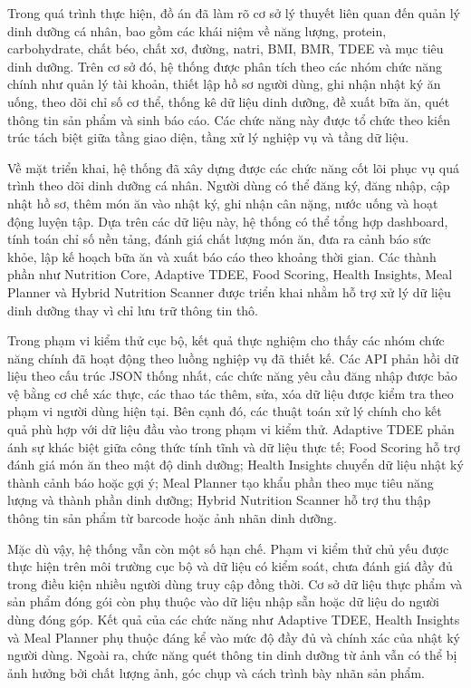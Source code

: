 Trong quá trình thực hiện, đồ án đã làm rõ cơ sở lý thuyết liên quan đến quản lý dinh dưỡng cá nhân, bao gồm các khái niệm về năng lượng, protein, carbohydrate, chất béo, chất xơ, đường, natri, BMI, BMR, TDEE và mục tiêu dinh dưỡng. Trên cơ sở đó, hệ thống được phân tích theo các nhóm chức năng chính như quản lý tài khoản, thiết lập hồ sơ người dùng, ghi nhận nhật ký ăn uống, theo dõi chỉ số cơ thể, thống kê dữ liệu dinh dưỡng, đề xuất bữa ăn, quét thông tin sản phẩm và sinh báo cáo. Các chức năng này được tổ chức theo kiến trúc tách biệt giữa tầng giao diện, tầng xử lý nghiệp vụ và tầng dữ liệu.

Về mặt triển khai, hệ thống đã xây dựng được các chức năng cốt lõi phục vụ quá trình theo dõi dinh dưỡng cá nhân. Người dùng có thể đăng ký, đăng nhập, cập nhật hồ sơ, thêm món ăn vào nhật ký, ghi nhận cân nặng, nước uống và hoạt động luyện tập. Dựa trên các dữ liệu này, hệ thống có thể tổng hợp dashboard, tính toán chỉ số nền tảng, đánh giá chất lượng món ăn, đưa ra cảnh báo sức khỏe, lập kế hoạch bữa ăn và xuất báo cáo theo khoảng thời gian. Các thành phần như Nutrition Core, Adaptive TDEE, Food Scoring, Health Insights, Meal Planner và Hybrid Nutrition Scanner được triển khai nhằm hỗ trợ xử lý dữ liệu dinh dưỡng thay vì chỉ lưu trữ thông tin thô.

Trong phạm vi kiểm thử cục bộ, kết quả thực nghiệm cho thấy các nhóm chức năng chính đã hoạt động theo luồng nghiệp vụ đã thiết kế. Các API phản hồi dữ liệu theo cấu trúc JSON thống nhất, các chức năng yêu cầu đăng nhập được bảo vệ bằng cơ chế xác thực, các thao tác thêm, sửa, xóa dữ liệu được kiểm tra theo phạm vi người dùng hiện tại. Bên cạnh đó, các thuật toán xử lý chính cho kết quả phù hợp với dữ liệu đầu vào trong phạm vi kiểm thử. Adaptive TDEE phản ánh sự khác biệt giữa công thức tính tĩnh và dữ liệu thực tế; Food Scoring hỗ trợ đánh giá món ăn theo mật độ dinh dưỡng; Health Insights chuyển dữ liệu nhật ký thành cảnh báo hoặc gợi ý; Meal Planner tạo khẩu phần theo mục tiêu năng lượng và thành phần dinh dưỡng; Hybrid Nutrition Scanner hỗ trợ thu thập thông tin sản phẩm từ barcode hoặc ảnh nhãn dinh dưỡng.

Mặc dù vậy, hệ thống vẫn còn một số hạn chế. Phạm vi kiểm thử chủ yếu được thực hiện trên môi trường cục bộ và dữ liệu có kiểm soát, chưa đánh giá đầy đủ trong điều kiện nhiều người dùng truy cập đồng thời. Cơ sở dữ liệu thực phẩm và sản phẩm đóng gói còn phụ thuộc vào dữ liệu nhập sẵn hoặc dữ liệu do người dùng đóng góp. Kết quả của các chức năng như Adaptive TDEE, Health Insights và Meal Planner phụ thuộc đáng kể vào mức độ đầy đủ và chính xác của nhật ký người dùng. Ngoài ra, chức năng quét thông tin dinh dưỡng từ ảnh vẫn có thể bị ảnh hưởng bởi chất lượng ảnh, góc chụp và cách trình bày nhãn sản phẩm.

